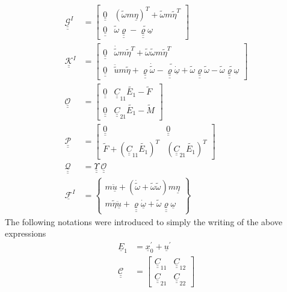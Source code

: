\documentclass{aiaa-tc}
\newcommand{\tens}[1]{\underline{\underline{#1}}}
\renewcommand{\vec}[1]{\underline{#1}}
\begin{document}
\begin{align}
        \label{mathcalG}
        \tens{\mathcal{G}}^I &= \begin{bmatrix}
        \tens{0} & (\tilde{\omega} m \vec{\eta})^T+\tilde{\omega} m \tilde{\eta}^T  \\
        \tens{0} & \tilde{\omega} \tens{\varrho}-\widetilde{\tens{\varrho} \vec{\omega}}
        \end{bmatrix} \\
        \label{mathcalK}
        \tens{\mathcal{K}}^I &= \begin{bmatrix}
        \tens{0} & \dot{\tilde{\omega}}m\tilde{\eta}^T + \tilde{\omega} \tilde{\omega}m\tilde{\eta}^T  \\
        \tens{0} & \ddot{\tilde{u}}m\tilde{\eta} + \tens{\varrho} \dot{\tilde{\omega}}-\widetilde{\tens{\varrho} \vec{\dot{\omega}}}+\tilde{\omega} \tens{\varrho} \tilde{\omega} - \tilde{\omega}  \widetilde{\tens{\varrho} \vec{\omega}}
        \end{bmatrix}\\
	\label{mathcalO}
	\mathcal{\tens{O}} &= \begin{bmatrix}
	\tens{0} & \tens{C}_{11} \tilde{E_1} - \tilde{F} \\
	\tens{0}& \tens{C}_{21} \tilde{E_1} - \tilde{M}
	\end{bmatrix} \\
	\label{mathcalP}
	\mathcal{\tens{P}} &= \begin{bmatrix}
	\tens{0} & \tens{0} \\
	\tilde{F} +  (\tens{C}_{11} \tilde{E_1})^T & (\tens{C}_{21} \tilde{E_1})^T
	\end{bmatrix}  \\
	\label{mathcalQ}
	\mathcal{\tens{Q}} &= \tens{\Upsilon}~ \mathcal{\tens{O}} \\
	\label{mathcalF}
	\vec{\mathcal{F}}^I &= \begin{Bmatrix}
	m \ddot{\vec{u}} + (\dot{\tilde{\omega}} + \tilde{\omega} \tilde{\omega})m \vec{\eta} \\
	m \tilde{\eta} \ddot{\vec{u}} +\tens{\varrho}\dot{\vec{\omega}}+\tilde{\omega}\tens{\varrho}\vec{\omega}
	\end{Bmatrix}
\end{align}
The following notations were introduced to simply the writing of the above expressions
\begin{align}
    \label{E1}
    \vec{E}_1 &= \vec{x}_0^\prime + \vec{u}^\prime \\
    \label{PartC}
    \tens{\mathcal{C}} &= \begin{bmatrix}
    \tens{C}_{11} & \tens{C}_{12} \\
    \tens{C}_{21} & \tens{C}_{22}
    \end{bmatrix}
\end{align}
 
\end{document}
